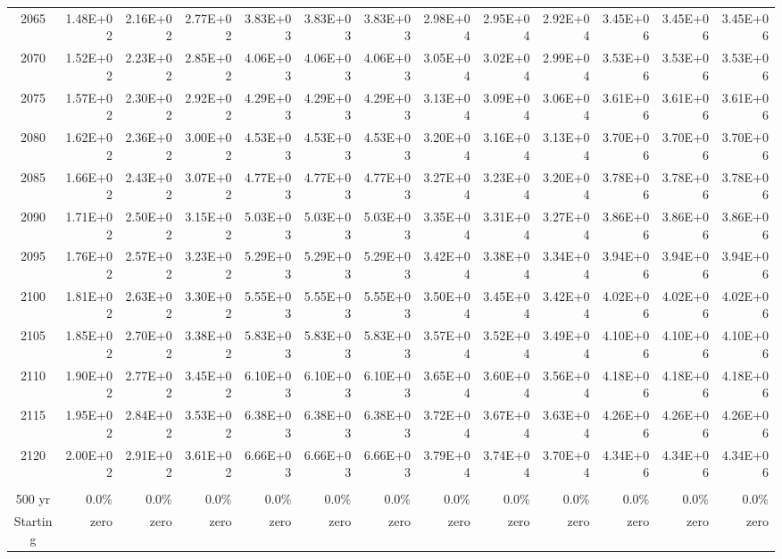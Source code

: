 \documentclass{article}
\begin{document}
\begin{table}
\begin{tabular}{crrr|rrr|rrr|rrr}
2065     & 1.48E+02 & 2.16E+02 & 2.77E+02 & 3.83E+03 & 3.83E+03 & 3.83E+03 & 2.98E+04 & 2.95E+04 & 2.92E+04 & 3.45E+06 & 3.45E+06 & 3.45E+06 \\
2070     & 1.52E+02 & 2.23E+02 & 2.85E+02 & 4.06E+03 & 4.06E+03 & 4.06E+03 & 3.05E+04 & 3.02E+04 & 2.99E+04 & 3.53E+06 & 3.53E+06 & 3.53E+06 \\
2075     & 1.57E+02 & 2.30E+02 & 2.92E+02 & 4.29E+03 & 4.29E+03 & 4.29E+03 & 3.13E+04 & 3.09E+04 & 3.06E+04 & 3.61E+06 & 3.61E+06 & 3.61E+06 \\
2080     & 1.62E+02 & 2.36E+02 & 3.00E+02 & 4.53E+03 & 4.53E+03 & 4.53E+03 & 3.20E+04 & 3.16E+04 & 3.13E+04 & 3.70E+06 & 3.70E+06 & 3.70E+06 \\
2085     & 1.66E+02 & 2.43E+02 & 3.07E+02 & 4.77E+03 & 4.77E+03 & 4.77E+03 & 3.27E+04 & 3.23E+04 & 3.20E+04 & 3.78E+06 & 3.78E+06 & 3.78E+06 \\
2090     & 1.71E+02 & 2.50E+02 & 3.15E+02 & 5.03E+03 & 5.03E+03 & 5.03E+03 & 3.35E+04 & 3.31E+04 & 3.27E+04 & 3.86E+06 & 3.86E+06 & 3.86E+06 \\
2095     & 1.76E+02 & 2.57E+02 & 3.23E+02 & 5.29E+03 & 5.29E+03 & 5.29E+03 & 3.42E+04 & 3.38E+04 & 3.34E+04 & 3.94E+06 & 3.94E+06 & 3.94E+06 \\
2100     & 1.81E+02 & 2.63E+02 & 3.30E+02 & 5.55E+03 & 5.55E+03 & 5.55E+03 & 3.50E+04 & 3.45E+04 & 3.42E+04 & 4.02E+06 & 4.02E+06 & 4.02E+06 \\
2105     & 1.85E+02 & 2.70E+02 & 3.38E+02 & 5.83E+03 & 5.83E+03 & 5.83E+03 & 3.57E+04 & 3.52E+04 & 3.49E+04 & 4.10E+06 & 4.10E+06 & 4.10E+06 \\
2110     & 1.90E+02 & 2.77E+02 & 3.45E+02 & 6.10E+03 & 6.10E+03 & 6.10E+03 & 3.65E+04 & 3.60E+04 & 3.56E+04 & 4.18E+06 & 4.18E+06 & 4.18E+06 \\
2115     & 1.95E+02 & 2.84E+02 & 3.53E+02 & 6.38E+03 & 6.38E+03 & 6.38E+03 & 3.72E+04 & 3.67E+04 & 3.63E+04 & 4.26E+06 & 4.26E+06 & 4.26E+06 \\
2120     & 2.00E+02 & 2.91E+02 & 3.61E+02 & 6.66E+03 & 6.66E+03 & 6.66E+03 & 3.79E+04 & 3.74E+04 & 3.70E+04 & 4.34E+06 & 4.34E+06 & 4.34E+06 \\
         &          &          &          &          &          &          &          &          &          &          &          &          \\ \hline
500 yr   & 0.0\%    & 0.0\%    & 0.0\%    & 0.0\%    & 0.0\%    & 0.0\%    & 0.0\%    & 0.0\%    & 0.0\%    & 0.0\%    & 0.0\%    & 0.0\%    \\
Starting & zero     & zero     & zero     & zero     & zero     & zero     & zero     & zero     & zero     & zero     & zero     & zero     \\

\end{tabular}
\end{table}
\end{document}
